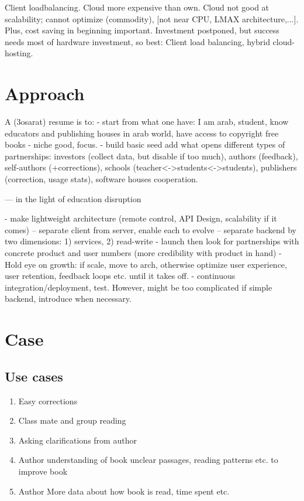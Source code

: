 \documentclass[a4paper,10pt]{article}
\begin{document}
Client loadbalancing.
Cloud more expensive than own. Cloud not good at scalability; cannot optimize (commodity), [not near CPU, LMAX architecture,...].
Plus, cost saving in beginning important. Investment postponed, but success needs most of hardware investment, so best:
Client load balancing, hybrid cloud-hosting.

\section{Approach}
A (3osarat) resume is to:
- start from what one have: I am arab, student, know educators and publishing houses in arab world, have access to copyright free books
- niche good, focus.
- build basic seed add what opens different types of partnerships: investors (collect data, but disable if too much), authors (feedback), 
self-authors (+corrections), schools (teacher<->students<->students), publishers (correction, usage stats), software houses cooperation.

--- in the light of education disruption

- make lightweight architecture (remote control, API Design, scalability if it comes)
-- separate client from server, enable each to evolve 
-- separate backend by two dimensions: 1) services, 2) read-write
- launch then look for partnerships with concrete product and user numbers (more credibility with product in hand)
- Hold eye on growth: if scale, move to arch, otherwise optimize user experience, user retention, feedback loops etc. until it takes off.
- continuous integration/deployment, test. However, might be too complicated if simple backend, introduce when necessary.


\section{Case}
\subsection{Use cases}
\begin{enumerate}
\item Easy corrections
\item Class mate and group reading
\item Asking clarifications from author
\item Author understanding of book unclear passages, reading patterns etc. to improve book
\item Author More data about how book is read, time spent etc.
\end{enumerate}
 
\end{document}
